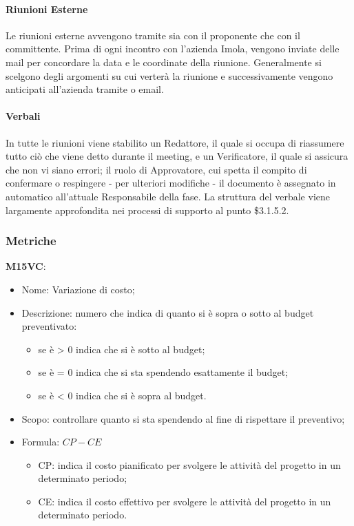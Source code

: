 \paragraph{Riunioni Esterne} \hfill \break
Le riunioni esterne avvengono tramite  sia con il proponente che con il committente. Prima di ogni incontro con 
l'azienda Imola, vengono inviate delle mail per concordare la data e le coordinate della riunione. Generalmente si scelgono
degli argomenti su cui verterà la riunione e successivamente vengono anticipati all'azienda tramite  o email.

\paragraph{Verbali} \hfill \break
In tutte le riunioni viene stabilito un Redattore, il quale si occupa di riassumere tutto ciò che
viene detto durante il meeting, e un Verificatore, il quale si assicura che non vi siano errori; 
il ruolo di Approvatore, cui spetta il compito di confermare o respingere - per ulteriori modifiche - il 
documento è assegnato in automatico all'attuale Responsabile della fase. La struttura del verbale viene 
largamente approfondita nei processi di supporto al punto \$3.1.5.2.

\subsubsection{Metriche}
\textbf{M15VC}:
\begin{itemize}
    \item Nome: Variazione di costo;
    \item Descrizione: numero che indica di quanto si è sopra o sotto al budget preventivato:
         \begin{itemize}
            \item se è > 0 indica che si è sotto al budget;
            \item se è = 0 indica che si sta spendendo esattamente il budget;
            \item se è < 0 indica che si è sopra al budget.
        \end{itemize}
    \item Scopo: controllare quanto si sta spendendo al fine di rispettare il preventivo;
    \item Formula: $ CP - CE $
        \begin{itemize}
            \item CP: indica il costo pianificato per svolgere le attività del progetto in un determinato 
            periodo;
            \item CE: indica il costo effettivo per svolgere le attività del progetto in un determinato 
            periodo.
        \end{itemize}
\end{itemize}

